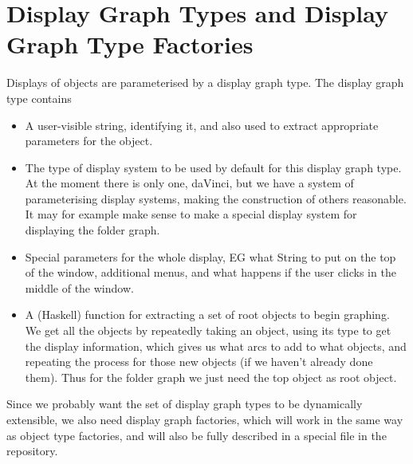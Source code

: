 \documentclass[a4paper]{article}
\begin{document}
\section{Display Graph Types and Display Graph Type Factories}
Displays of objects are parameterised by a display graph type.
The display graph type contains
\begin{itemize}
\item A user-visible string, identifying it, and also used to
      extract appropriate parameters for the object.
\item The type of display system to be used by default for this
      display graph type.  At the moment there is only one,
      daVinci, but we have a system of parameterising display systems, 
      making the construction of others reasonable.  It may for 
      example make sense to make a 
      special display system for displaying the folder graph.
\item Special parameters for the whole display, EG what String to
      put on the top of the window, additional menus, and what happens
      if the user clicks in the middle of the window.
\item A (Haskell) function for extracting a set of root objects to
      begin graphing.  We get all the objects by repeatedly
      taking an object, using its type to get the display information,
      which gives us what arcs to add to what objects, and repeating
      the process for those new objects (if we haven't already done them).
      Thus for the folder graph we just need the top object as root object.
\end{itemize}
Since we probably want the set of display graph types to be dynamically
extensible, we also need display graph factories, which will work in the
same way as object type factories, and will also be fully described in
a special file in the repository.
\end{document}
